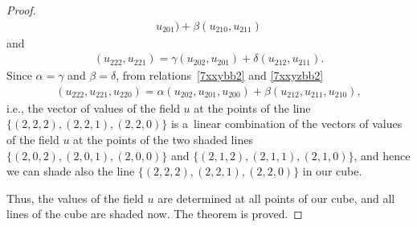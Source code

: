 \begin{proof}
\begin{gather}
u_{2 0 1}) + \beta (u_{2 1 0}, u_{2 1 1}) \label{7xxybb2}
\end{gather} and
\begin{gather}
(u_{2 2 2}, u_{2 2 1}) = \gamma (u_{2 0 2}, u_{2 0 1}) + \delta
(u_{2 1 2}, u_{2 1 1}). \label{7xxyzbb2}
\end{gather} Since $\alpha = \gamma$
and $\beta = \delta$, from relations~\eqref{7xxybb2} and
\eqref{7xxyzbb2}
\begin{gather*} (u_{2 2 2}, u_{2 2 1}, u_{2 2 0}) = \alpha
(u_{2 0 2}, u_{2 0 1}, u_{2 0 0}) + \beta (u_{2 1 2}, u_{2 1 1},
u_{2 1 0}), %
\end{gather*} i.e., the vector of values of the
f\/ield $u$ at the points of the line $\{(2, 2, 2), (2, 2, 1), (2, 2,
0)\}$ is a~linear combination of the vectors of values of the f\/ield
$u$ at the points of the two shaded lines $\{(2, 0, 2), (2, 0, 1),
(2, 0, 0)\}$ and $\{(2, 1, 2), (2, 1, 1), (2, 1, 0)\}$, and hence we
can shade also the line $\{(2, 2, 2), (2, 2, 1), (2, 2, 0)\}$ in our
cube.


Thus, the values of the f\/ield $u$ are determined at all points of
our cube, and all lines of the cube are shaded now. The theorem is
proved.
\end{proof}
